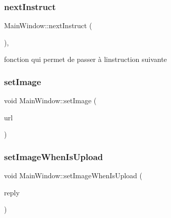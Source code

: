 \subsubsection{\texorpdfstring{next\+Instruct}{nextInstruct}}
{\footnotesize\ttfamily Main\+Window\+::next\+Instruct (\begin{DoxyParamCaption}{ }\end{DoxyParamCaption})\hspace{0.3cm}{\ttfamily [private]}, {\ttfamily [slot]}}



fonction qui permet de passer à l\textquotesingle{}instruction suivante 

\mbox{\label{classMainWindow_aaddccbd976fda27cf2d17b9f43dbc486}} 
\subsubsection{\texorpdfstring{set\+Image}{setImage}}
{\footnotesize\ttfamily void Main\+Window\+::set\+Image (\begin{DoxyParamCaption}\item[{Q\+String}]{url }\end{DoxyParamCaption})\hspace{0.3cm}{\ttfamily [slot]}}

\mbox{\label{classMainWindow_ae58368ff237b1f298381a0aeaf8e7290}} 
\subsubsection{\texorpdfstring{set\+Image\+When\+Is\+Upload}{setImageWhenIsUpload}}
{\footnotesize\ttfamily void Main\+Window\+::set\+Image\+When\+Is\+Upload (\begin{DoxyParamCaption}\item[{Q\+Network\+Reply $\ast$}]{reply }\end{DoxyParamCaption})\hspace{0.3cm}{\ttfamily [slot]}}

\mbox{\label{classMainWindow_a344d21527850380c306fe7ac165321bd}} 

